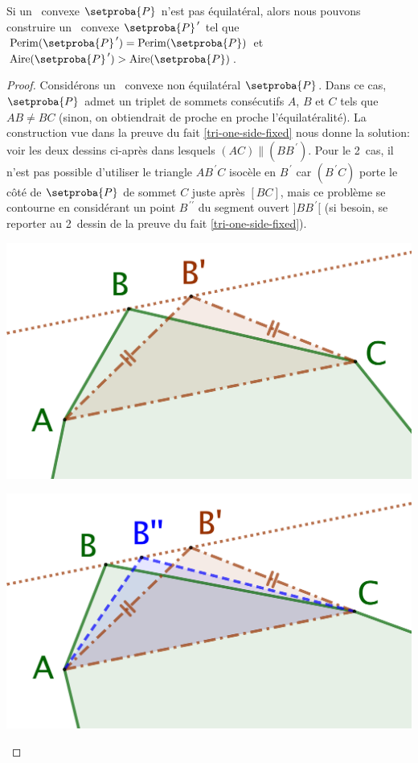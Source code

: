 

\begin{fact} \label{must-be-equi}
	Si un \ngone\ convexe $\setproba{P}$ n'est pas équilatéral,
	alors nous pouvons construire un \ngone\ convexe $\primeit{\setproba{P}}$ tel que
	$\perim{\primeit{\setproba{P}}} = \perim{\setproba{P}}$
	et
	$\area{\primeit{\setproba{P}}} > \area{\setproba{P}}$.
\end{fact}


\begin{proof}
	Considérons un \ngone\ convexe non équilatéral $\setproba{P}$.
	Dans ce cas, $\setproba{P}$ admet un triplet de sommets consécutifs $A$, $B$ et $C$ tels que $AB \neq BC$
	(sinon, on obtiendrait de proche en proche l'équilatéralité).
	La construction vue dans la preuve du fait \ref{tri-one-side-fixed} nous donne la solution: voir les deux dessins ci-après dans lesquels $(AC) \parallel (BB^{\,\prime})$.
	Pour le 2\ieme\ cas, il n'est pas possible d'utiliser le triangle $AB^{\,\prime}C$ isocèle en $B^{\,\prime}$ car $(B^{\,\prime}C)$ porte le côté de $\setproba{P}$ de sommet $C$ juste après $[BC]$, mais ce problème se contourne en considérant un point $B^{\,\prime\prime}$ du segment ouvert $]BB^{\,\prime}[$ (si besoin, se reporter au 2\ieme\ dessin de la preuve du fait \ref{tri-one-side-fixed}).
	\begin{multicols}{2}
		\centering

		\includegraphics[scale=.4]{content/polygon/sol-must-be/not-iso-OK.png}

		\includegraphics[scale=.4]{content/polygon/sol-must-be/not-iso-KO.png}
	\end{multicols}


\end{proof}
